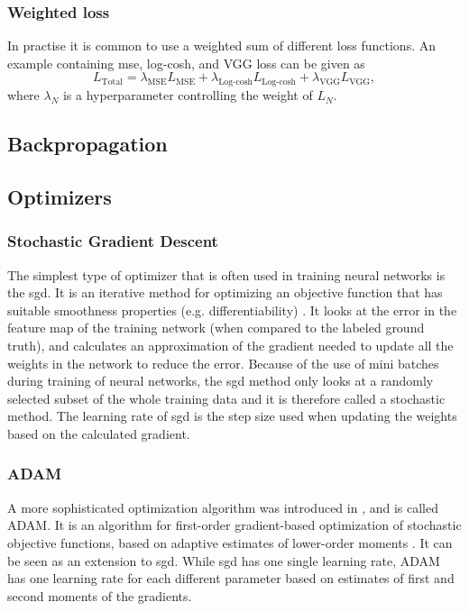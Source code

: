 \subsubsection{Weighted loss}
In practise it is common to use a weighted sum of different loss functions. 
An example containing \acrshort{mse}, log-cosh, and VGG loss can be given as
\begin{equation}
    \label{eq:weightedloss}
    L_{\text{Total}} = \lambda_{\text{MSE}}L_{\text{MSE}} + \lambda_{\text{Log-cosh}}L_{\text{Log-cosh}} + \lambda_{\text{VGG}}L_{\text{VGG}},
\end{equation}
where $\lambda_N$ is a hyperparameter controlling the weight of $L_N$. 

\subsection{Backpropagation}
\todo[inline]{}

\subsection{Optimizers}
\todo[inline]{}

\subsubsection{Stochastic Gradient Descent}
The simplest type of optimizer that is often used in training neural networks is the \acrfull{sgd}. It is an iterative method for optimizing an objective function that has suitable smoothness properties (e.g. differentiability) \cite{stochasticgradientdescent}. It looks at the error in the feature map of the training network (when compared to the labeled ground truth), and calculates an approximation of the gradient needed to update all the weights in the network to reduce the error. Because of the use of mini batches during training of neural networks, the \acrshort{sgd} method only looks at a randomly selected subset of the whole training data and it is therefore called a stochastic method. The learning rate of \acrshort{sgd} is the step size used when updating the weights based on the calculated gradient.

\subsubsection{ADAM}
A more sophisticated optimization algorithm was introduced in \citeyear{kingma2015adam}, and is called ADAM. It is an algorithm for first-order gradient-based optimization of stochastic objective functions, based on adaptive estimates of lower-order moments \cite{kingma2015adam}. It can be seen as an extension to \acrshort{sgd}. While \acrshort{sgd} has one single learning rate, ADAM has one learning rate for each different parameter based on estimates of first and second moments of the gradients. 